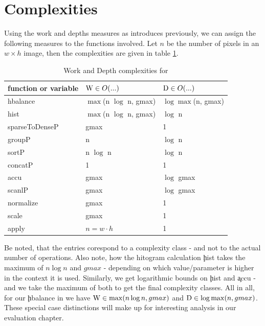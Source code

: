 \section{Complexities}
  Using the work and depths measures as introduces previously,
  we can assign the following measures to the functions involved.
  Let $n$ be the number of pixels in an $w \times h$ image,
  then the complexities are given in table \ref{complexities:ndpn}.
  \begin{table}[h!]
    \caption{Work and Depth complexities for \ndpn}
    \label{complexities:ndpn}
    \begin{center}
    \begin{tabular}{lll}
        \toprule
        function or variable & $\textrm{W} \in O(...)$           & $\textrm{D} \in O(...)$ \\
        \midrule
        hbalance        & $\max$(n $\log$ n, gmax) & $\log \max$(n, gmax) \\
        \midrule
        hist            & $\max$(n $\log$ n, gmax) & $\log$ n \\
        sparseToDenseP  & gmax                 & 1 \\
        groupP          & n                    & $\log$ n \\
        sortP           & n $\log$ n             & $\log$ n \\
        concatP         & 1                    & 1 \\
        \midrule
        accu            & gmax                 & $\log$ gmax \\
        scanlP          & gmax                 & $\log$ gmax \\
        \midrule
        normalize       & gmax                 & 1 \\
        scale           & gmax                 & 1 \\
        \midrule
        apply           & $n = w \cdot h$ & 1 \\
    \end{tabular}
    \end{center}
  \end{table}
    Be noted, that the entries corespond to a complexity class - 
    and not to the actual number of operations.
    Also note, how the hitogram calculation \c{hist} takes the
    maximum of $n \log n$ and $gmax$ - depending on which value/parameter
    is higher in the context it is used. Similarly,
    we get logarithmic bounds on \c{hist} and \c{accu} - and we take
    the maximum of both to get the final complexity classes.
    All in all, for our \c{hbalance} in \ndpn we have $\textrm{W} \in \max(n \log n, gmax)$
    and $\textrm{D} \in \log \max(n,gmax)$.
    These special case distinctions will make up for interesting analysis
    in our evaluation chapter.
    
